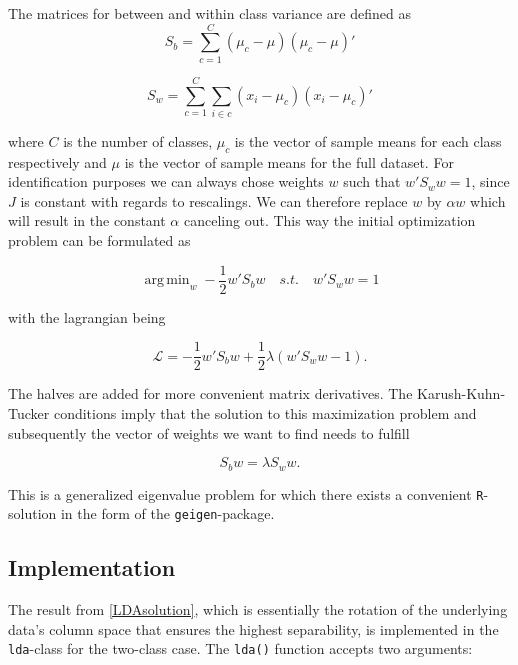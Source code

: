 \documentclass{article}
\DeclareMathOperator*{\argmin}{arg\,min}
\begin{document}
The matrices for between and within class variance are defined as
\begin{equation}
S_b = \sum_{c=1}^{C}(\mu_c - \mu)(\mu_c - \mu)\prime
\end{equation}

\begin{equation}
\label{Sw}
S_w = \sum_{c=1}^{C}\sum_{i \in c}(x_i - \mu_c)(x_i - \mu_c)\prime
\end{equation} 

where $C$ is the number of classes, $\mu_c$ is the vector of sample means for each class respectively and $\mu$ is the vector of sample means for the full dataset. For identification purposes we can always chose weights $w$ such that $w\prime S_w w = 1$, since $J$ is constant with regards to rescalings. We can therefore replace $w$ by $\alpha w$ which will result in the constant $\alpha$ canceling out. This way the initial optimization problem can be formulated as

\begin{equation}
\argmin_{w} -\frac{1}{2} w\prime S_b w \quad s.t. \quad w \prime S_w w = 1
\end{equation}

with the lagrangian being

\begin{equation}
\mathcal{L} = -\frac{1}{2} w\prime S_b w + \frac{1}{2}\lambda\left(w\prime S_w w - 1\right).
\end{equation}

The halves are added for more convenient matrix derivatives. The Karush-Kuhn-Tucker conditions imply that the solution to this maximization problem and subsequently the vector of weights we want to find needs to fulfill

\begin{equation}
\label{LDAsolution}
S_b w = \lambda S_w w.
\end{equation}

This is a generalized eigenvalue problem for which there exists a convenient \texttt{R}-solution in the form of the \texttt{geigen}-package.
\subsection{Implementation}

The result from \ref{LDAsolution}, which is essentially the rotation of the underlying data's column space that ensures the highest separability, is implemented in the \texttt{lda}-class for the two-class case. The \texttt{lda()} function accepts two arguments:
\end{document}
